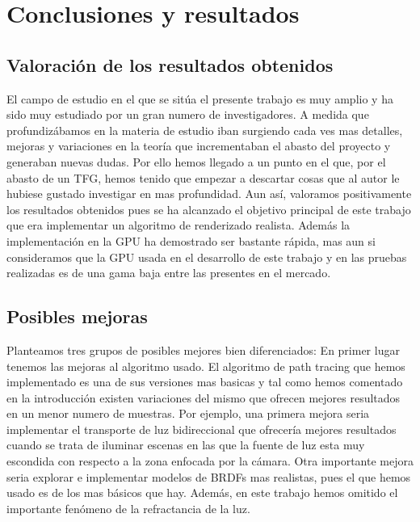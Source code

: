 \chapter{Conclusiones y resultados}


\section{Valoración de los resultados obtenidos}


El campo de estudio en el que se sitúa el presente trabajo es muy amplio y ha sido muy estudiado por un gran numero de investigadores. A medida que profundizábamos en la materia de estudio iban surgiendo cada ves mas detalles, mejoras y variaciones en la teoría que incrementaban el abasto del proyecto y generaban nuevas dudas. Por ello hemos llegado a un punto en el que, por el abasto de un TFG, hemos tenido que empezar a descartar cosas que al autor le hubiese gustado investigar en mas profundidad. Aun así, valoramos positivamente los resultados obtenidos pues se ha alcanzado el objetivo principal de este trabajo que era implementar un algoritmo de renderizado realista. Además la implementación en la GPU ha demostrado ser bastante rápida, mas aun si consideramos que la GPU usada en el desarrollo de este trabajo y en las pruebas realizadas es de una gama baja entre las presentes en el mercado.

\section{Posibles mejoras}

Planteamos tres grupos de posibles mejores bien diferenciados: En primer lugar tenemos las mejoras al algoritmo usado. El algoritmo de path tracing que hemos implementado es una de sus versiones mas basicas y tal como hemos comentado en la introducción existen variaciones del mismo que ofrecen mejores resultados en un menor numero de muestras. Por ejemplo, una primera mejora seria implementar el transporte de luz bidireccional que ofrecería mejores resultados cuando se trata de iluminar escenas en las que la fuente de luz esta muy escondida con respecto a la zona enfocada por la cámara. Otra importante mejora seria explorar e implementar modelos de BRDFs mas realistas, pues el que hemos usado es de los mas básicos que hay. Además, en este trabajo hemos omitido el importante fenómeno de la refractancia de la luz.

\medskip

